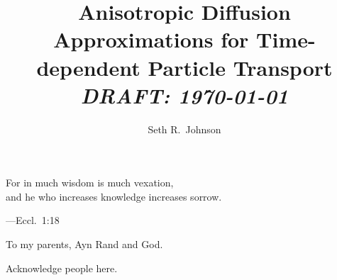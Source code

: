 \documentclass{umthesis}
\author{Seth R.~Johnson}
\title{Anisotropic Diffusion Approximations for Time-dependent Particle
Transport\texorpdfstring{\\%
  \emph{DRAFT: \today}}{}
}
\begin{document}
\allowdisplaybreaks
\setlength{\parskip}{0pt plus 0pt minus 0pt}

\frontmatter

\maketitle


\begin{frontispiece}
\begin{flushleft}
For in much wisdom is much vexation,\hfill\\
\hspace{1.5em}and he who increases knowledge increases sorrow.
\end{flushleft}
---Eccl.~1:18
\end{frontispiece}


\begin{dedication}
  To my parents, Ayn Rand and God.
\end{dedication}


\begin{acknowledgments}
  Acknowledge people here.
\end{acknowledgments}



\tableofcontents
\listoftables
\listoffigures


\mainmatter











%

\backmatter


\end{document}
